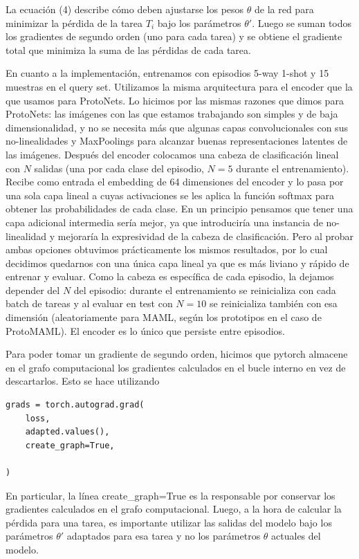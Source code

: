 \documentclass[12pt]{article}
\begin{document}
La ecuación (4) describe cómo deben ajustarse los pesos $\theta$ de la red para minimizar la pérdida de la tarea $T_i$ bajo los parámetros $\theta'$. Luego se suman todos los gradientes de segundo orden (uno para cada tarea) y se obtiene el gradiente total que minimiza la suma de las pérdidas de cada tarea.

En cuanto a la implementación, entrenamos con episodios 5-way 1-shot y 15 muestras en el query set. Utilizamos la misma arquitectura para el encoder que la que usamos para ProtoNets. Lo hicimos por las mismas razones que dimos para ProtoNets: las imágenes con las que estamos trabajando son simples y de baja dimensionalidad, y no se necesita más que algunas capas convolucionales con sus no-linealidades y MaxPoolings para alcanzar buenas representaciones latentes de las imágenes. Después del encoder colocamos una cabeza de clasificación lineal con $N$ salidas (una por cada clase del episodio, $N=5$ durante el entrenamiento). Recibe como entrada el embedding de 64 dimensiones del encoder y lo pasa por una sola capa lineal a cuyas activaciones se les aplica la función softmax para obtener las probabilidades de cada clase. En un principio pensamos que tener una capa adicional intermedia sería mejor, ya que introduciría una instancia de no-linealidad y mejoraría la expresividad de la cabeza de clasificación. Pero al probar ambas opciones obtuvimos prácticamente los mismos resultados, por lo cual decidimos quedarnos con una única capa lineal ya que es más liviano y rápido de entrenar y evaluar. Como la cabeza es específica de cada episodio, la dejamos depender del $N$ del episodio: durante el entrenamiento se reinicializa con cada batch de tareas y al evaluar en test con $N=10$ se reinicializa también con esa dimensión (aleatoriamente para MAML, según los prototipos en el caso de ProtoMAML). El encoder es lo único que persiste entre episodios.

Para poder tomar un gradiente de segundo orden, hicimos que pytorch almacene en el grafo computacional los gradientes calculados en el bucle interno en vez de descartarlos. Esto se hace utilizando

\begin{verbatim}
grads = torch.autograd.grad(
    loss,
    adapted.values(),
    create_graph=True,
    
)    
\end{verbatim}

En particular, la línea create\_graph=True es la responsable por conservar los gradientes calculados en el grafo computacional. Luego, a la hora de calcular la pérdida para una tarea, es importante utilizar las salidas del modelo bajo los parámetros $\theta'$ adaptados para esa tarea y no los parámetros $\theta$ actuales del modelo.
\end{document}
